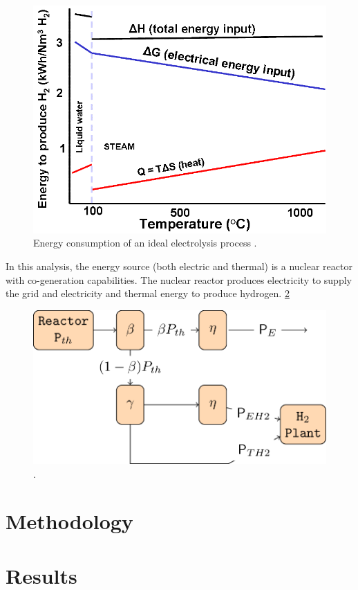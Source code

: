 \documentclass{anstrans}
\begin{document}
\begin{figure}[H]
	\centering
	\includegraphics[width=0.7\linewidth]{figures/ele-heat_curve.png}
	\hfill
	\caption{Energy consumption of an ideal electrolysis process \cite{hi2h2_highly_2007}.}
	\label{fig:electro}
\end{figure}

In this analysis, the energy source (both electric and thermal) is a nuclear reactor with co-generation capabilities. The nuclear reactor produces electricity to supply the grid and electricity and thermal energy to produce hydrogen. \ref{fig:h2diag}

\begin{figure}[H]
	\centering
	\includegraphics[width=0.7\linewidth]{figures/hte-figure0.png}
	\hfill
	\caption{.}
	\label{fig:h2diag}
\end{figure}


\section{Methodology}
\label{method}



\section{Results}
\end{document}
